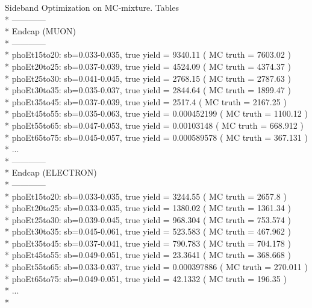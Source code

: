 \documentclass{beamer}
\begin{document}
\begin{frame}{Sideband Optimization on MC-mixture. Tables}\\*
\scriptsize
------------\\*
Endcap (MUON)\\*
------------\\*
phoEt15to20: sb=0.033-0.035, true yield = 9340.11 ( MC truth = 7603.02 ) \\*
phoEt20to25: sb=0.037-0.039, true yield = 4524.09 ( MC truth = 4374.37 ) \\*
phoEt25to30: sb=0.041-0.045, true yield = 2768.15 ( MC truth = 2787.63 ) \\*
phoEt30to35: sb=0.035-0.037, true yield = 2844.64 ( MC truth = 1899.47 ) \\*
phoEt35to45: sb=0.037-0.039, true yield = 2517.4 ( MC truth = 2167.25 ) \\*
phoEt45to55: sb=0.035-0.063, true yield = 0.000452199 ( MC truth = 1100.12 ) \\*
phoEt55to65: sb=0.047-0.053, true yield = 0.00103148 ( MC truth = 668.912 ) \\*
phoEt65to75: sb=0.045-0.057, true yield = 0.000589578 ( MC truth = 367.131 ) \\*
...\\*
------------\\*
Endcap (ELECTRON)\\*
------------\\*
phoEt15to20: sb=0.033-0.035, true yield = 3244.55 ( MC truth = 2657.8 ) \\*
phoEt20to25: sb=0.033-0.035, true yield = 1380.02 ( MC truth = 1361.34 ) \\*
phoEt25to30: sb=0.039-0.045, true yield = 968.304 ( MC truth = 753.574 ) \\*
phoEt30to35: sb=0.045-0.061, true yield = 523.583 ( MC truth = 467.962 ) \\*
phoEt35to45: sb=0.037-0.041, true yield = 790.783 ( MC truth = 704.178 ) \\*
phoEt45to55: sb=0.049-0.051, true yield = 23.3641 ( MC truth = 368.668 ) \\*
phoEt55to65: sb=0.033-0.037, true yield = 0.000397886 ( MC truth = 270.011 ) \\*
phoEt65to75: sb=0.049-0.051, true yield = 42.1332 ( MC truth = 196.35 ) \\*
...\\*
\end{frame}
\end{document}
